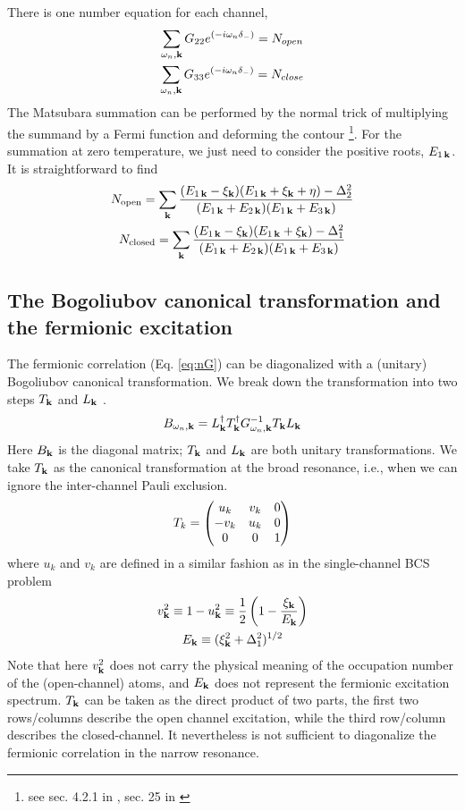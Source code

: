 \documentclass[reprint,pra]{revtex4-1}
\begin{document}
   There is one  number equation for each channel,  
\begin{gather*}
\sum_{\omega_{n}, \mathbf{k}}G_{22}e^{(-i\omega_n\delta_-)}=N_{open}\\
\sum_{\omega_{n},\mathbf{k}}G_{33}e^{(-i\omega_n\delta_-)}=N_{close}
\end{gather*}
 The Matsubara summation can be performed by the normal trick of multiplying the summand by a Fermi function and deforming the contour \footnote{see sec. 4.2.1 in \cite{Altland}, sec. 25 in \cite{Fetter}}.  For the summation at zero temperature, we just need to consider the positive roots, $E_{1\,\mathbf{k}}$.  It is straightforward to find 
\begin{gather}
N_{\text{open}}=\sum_{\mathbf{k}}\frac{(E_{1\,\mathbf{k}}-\xi_{\mathbf{k}})(E_{1\,\mathbf{k}}+\xi_{\mathbf{k}}+\eta)-\Delta_2^2}{(E_{1\,\mathbf{k}}+E_{2\,\mathbf{k}})(E_{1\,\mathbf{k}}+E_{3\,\mathbf{k}})}
\label{eq:pathInt2:numOpen}\\
N_{\text{closed}}=\sum_{\mathbf{k}}\frac{(E_{1\,\mathbf{k}}-\xi_{\mathbf{k}})(E_{1\,\mathbf{k}}+\xi_{\mathbf{k}})-\Delta_1^2}{(E_{1\,\mathbf{k}}+E_{2\,\mathbf{k}})(E_{1\,\mathbf{k}}+E_{3\,\mathbf{k}})}
\label{eq:pathInt2:numClose}
\end{gather}
 \subsection{The Bogoliubov canonical transformation and the  fermionic excitation\label{sec:fermionic}}
 The fermionic correlation (Eq. \ref{eq:nG}) can be diagonalized with a (unitary) Bogoliubov canonical transformation.  We  break down the transformation into two steps $T_{\mathbf{k}}$ and $L_{\mathbf{k}}$ . 
\begin{equation}\label{eq:pathInt2:B}
B_{\omega_{n},\mathbf{k}}=L_{\mathbf{k}}^{\dagger}T_{\mathbf{k}}^{\dagger}G_{\omega_{n},\mathbf{k}}^{-1}T_{\mathbf{k}}L_{\mathbf{k}}
\end{equation} 
Here $B_{\mathbf{k}}$ is the diagonal matrix; $T_{\mathbf{k}}$ and $L_{\mathbf{k}}$ are both unitary transformations.  We take $T_{\mathbf{k}}$ as the canonical transformation at the broad resonance, i.e., when we can ignore the inter-channel Pauli exclusion. 
\begin{equation}\label{eq:pathInt2:T}
T_k=\begin{pmatrix}u_k&v_k&0\\-v_k&u_k&0\\0&0&1\end{pmatrix}
\end{equation}	
where $u_{k}$ and $v_{k}$ are defined in a similar fashion as in the single-channel BCS  problem
\begin{gather}
v_{\mathbf{k}}^{2}\equiv1-u_{\mathbf{k}}^{2}\equiv\frac{1}{2}\left(1-\frac{\xi_{\mathbf{k}}}{E_{\mathbf{k}}}\right)\\
E_{\mathbf{k}}\equiv(\xi_{\mathbf{k}}^{2}+\Delta_{1}^{2})^{1/2}
\end{gather}
 Note that here $v_{\mathbf{k}}^{2}$  does not carry the physical meaning of the occupation number of the (open-channel) atoms, and $E_{\mathbf{k}}$   does not represent the fermionic excitation spectrum. $T_{\mathbf{k}}$ can be taken as the direct product of two parts, the first two rows/columns describe the open channel excitation, while the third row/column describes the closed-channel.  It nevertheless is not sufficient to diagonalize the fermionic correlation in the narrow resonance.  
\end{document}
